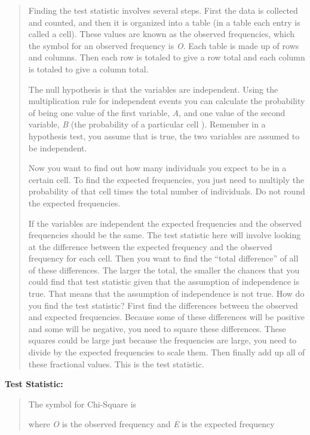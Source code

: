 \documentclass[]{book}
\begin{document}
\begin{quote}
Finding the test statistic involves several steps. First the data is collected and counted, and then it is organized into a table (in a table each entry is called a cell). These values are known as the observed frequencies, which the symbol for an observed frequency is \emph{O}. Each table is made up of rows and columns. Then each row is totaled to give a row total and each column is totaled to give a column total.

The null hypothesis is that the variables are independent. Using the multiplication rule for independent events you can calculate the probability of being one value of the first variable, \emph{A}, and one value of the second variable, \emph{B} (the probability of a particular cell ). Remember in a hypothesis test, you assume that is true, the two variables are assumed to be independent.

Now you want to find out how many individuals you expect to be in a certain cell. To find the expected frequencies, you just need to multiply the probability of that cell times the total number of individuals. Do not round the expected frequencies.

If the variables are independent the expected frequencies and the observed frequencies should be the same. The test statistic here will involve looking at the difference between the expected frequency and the observed frequency for each cell. Then you want to find the ``total difference'' of all of these differences. The larger the total, the smaller the chances that you could find that test statistic given that the assumption of independence is true. That means that the assumption of independence is not true. How do you find the test statistic? First find the differences between the observed and expected frequencies. Because some of these differences will be positive and some will be negative, you need to square these differences. These squares could be large just because the frequencies are large, you need to divide by the expected frequencies to scale them. Then finally add up all of these fractional values. This is the test statistic.
\end{quote}

\textbf{Test Statistic:}

\begin{quote}
The symbol for Chi-Square is

where \emph{O} is the observed frequency and \emph{E} is the expected frequency
\end{quote}
\end{document}
